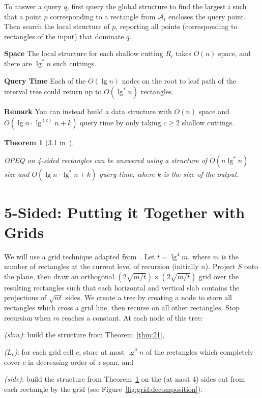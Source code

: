 \documentclass[letterpaper,12pt,twocolumn]{article}
\newcommand\lspace{\hspace{-0.5em}}
\newcommand{\BigOh}[1]{O\!\left(#1\right)}
\theoremstyle{plain}
\newtheorem{theorem}{Theorem}
\begin{document}
To answer a query $q$, first query the global structure to find the
largest $i$ such that a point $p$ corresponding to a rectangle from
$\mathcal{A}_i$ encloses the query point.  Then search the local
structure of $p$, reporting all points (corresponding to rectangles of
the input) that dominate $q$.

\textbf{Space} The local structure for each shallow cutting $R_i$
takes $\BigOh{n}$ space, and there are $\lg^* n$ such cuttings.

\textbf{Query Time} Each of the $\BigOh{\lg n}$ nodes on the root to
leaf path of the interval tree could return up to $\BigOh{\lg^* n}$
rectangles.

\textbf{Remark} You can instead build a data structure with
$\BigOh{n}$ space and $\BigOh{\lg n\cdot\lg^{(c)}n + k}$ query time by only
taking $c \ge 2$ shallow cuttings.

\begin{theorem}[3.1 in~\cite{rahul2015improved}]\label{thm:31}

  OPEQ on 4-sided rectangles can be answered using a structure of
  $\BigOh{n\lg^* n}$ size and $\BigOh{\lg n \cdot \lg^* n + k}$
  query time, where $k$ is the size of the output.

\end{theorem}

\section{\lspace{} 5-Sided: Putting it Together with Grids}
\label{sec:5sided}

We will use a grid technique adapted from~\cite{alstrup2000new}.  Let
$t = \lg^4 m$, where $m$ is the number of rectangles at the current
level of recursion (initially $n$).  Project $S$ onto the plane, then
draw an orthogonal $(2\sqrt{m/t})\times(2\sqrt{m/t})$ grid over the
resulting rectangles such that each horizontal and vertical slab
contains the projections of $\sqrt{nt}$ sides.  We create a tree by
creating a node to store all rectangles which cross a grid line, then
recurse on all other rectangles.  Stop recursion when $m$ reaches a
constant.  At each node of this tree:
%
\begin{enumerate*}[label=(\roman*)] %
\item \emph{(slow)}: build the structure from Theorem~\ref{thm:21},
\item \emph{($L_c$)}: for each grid cell $c$, store at most $\lg^3 n$
  of the rectangles which completely cover $c$ in decreasing order of
  $z$ span, and
\item \emph{(side)}: build the structure from Theorem~\ref{thm:31} on
  the (at most 4) sides cut from each rectangle by the grid (see
  Figure~\ref{fig:grid:decomposition}).
\end{enumerate*}
\end{document}
